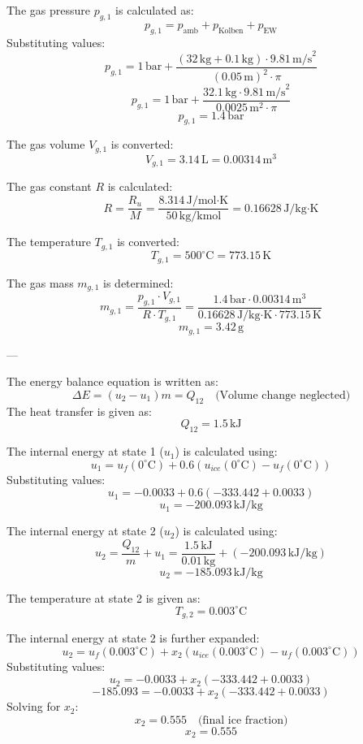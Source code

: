 The gas pressure \( p_{g,1} \) is calculated as:  
\[
p_{g,1} = p_{\text{amb}} + p_{\text{Kolben}} + p_{\text{EW}}
\]  
Substituting values:  
\[
p_{g,1} = 1 \, \text{bar} + \frac{(32 \, \text{kg} + 0.1 \, \text{kg}) \cdot 9.81 \, \text{m/s}^2}{(0.05 \, \text{m})^2 \cdot \pi}
\]  
\[
p_{g,1} = 1 \, \text{bar} + \frac{32.1 \, \text{kg} \cdot 9.81 \, \text{m/s}^2}{0.0025 \, \text{m}^2 \cdot \pi}
\]  
\[
p_{g,1} = 1.4 \, \text{bar}
\]  

The gas volume \( V_{g,1} \) is converted:  
\[
V_{g,1} = 3.14 \, \text{L} = 0.00314 \, \text{m}^3
\]  

The gas constant \( R \) is calculated:  
\[
R = \frac{R_u}{M} = \frac{8.314 \, \text{J/mol·K}}{50 \, \text{kg/kmol}} = 0.16628 \, \text{J/kg·K}
\]  

The temperature \( T_{g,1} \) is converted:  
\[
T_{g,1} = 500^\circ\text{C} = 773.15 \, \text{K}
\]  

The gas mass \( m_{g,1} \) is determined:  
\[
m_{g,1} = \frac{p_{g,1} \cdot V_{g,1}}{R \cdot T_{g,1}} = \frac{1.4 \, \text{bar} \cdot 0.00314 \, \text{m}^3}{0.16628 \, \text{J/kg·K} \cdot 773.15 \, \text{K}}
\]  
\[
m_{g,1} = 3.42 \, \text{g}
\]  

---

The energy balance equation is written as:  
\[
\Delta E = (u_2 - u_1)m = Q_{12} \quad \text{(Volume change neglected)}
\]  
The heat transfer is given as:  
\[
Q_{12} = 1.5 \, \text{kJ}
\]  

The internal energy at state 1 (\(u_1\)) is calculated using:  
\[
u_1 = u_f(0^\circ\text{C}) + 0.6 \left( u_{ice}(0^\circ\text{C}) - u_f(0^\circ\text{C}) \right)
\]  
Substituting values:  
\[
u_1 = -0.0033 + 0.6 \left( -333.442 + 0.0033 \right)
\]  
\[
u_1 = -200.093 \, \text{kJ/kg}
\]  

The internal energy at state 2 (\(u_2\)) is calculated using:  
\[
u_2 = \frac{Q_{12}}{m} + u_1 = \frac{1.5 \, \text{kJ}}{0.01 \, \text{kg}} + (-200.093 \, \text{kJ/kg})
\]  
\[
u_2 = -185.093 \, \text{kJ/kg}
\]  

The temperature at state 2 is given as:  
\[
T_{g,2} = 0.003^\circ\text{C}
\]  

The internal energy at state 2 is further expanded:  
\[
u_2 = u_f(0.003^\circ\text{C}) + x_2 \left( u_{ice}(0.003^\circ\text{C}) - u_f(0.003^\circ\text{C}) \right)
\]  
Substituting values:  
\[
u_2 = -0.0033 + x_2 \left( -333.442 + 0.0033 \right)
\]  
\[
-185.093 = -0.0033 + x_2 \left( -333.442 + 0.0033 \right)
\]  
Solving for \(x_2\):  
\[
x_2 = 0.555 \quad \text{(final ice fraction)}
\]  
\[
x_2 = 0.555
\]